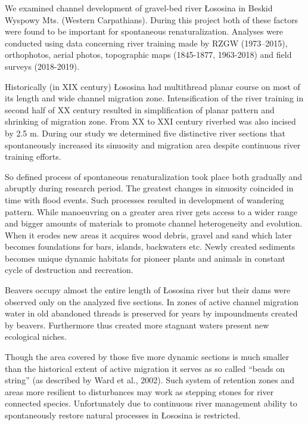 {We examined channel development of gravel-bed river Łososina in Beskid Wyspowy Mts. (Western Carpathians). During this project both of these factors were found to be important for spontaneous renaturalization. Analyses were conducted using data concerning river training made by RZGW (1973–2015), orthophotos, aerial photos, topographic maps (1845-1877, 1963-2018) and field surveys (2018-2019). 

Historically (in XIX century) Łososina had multithread planar course on most of its length and wide channel migration zone. Intensification of the river training in second half of XX century resulted in simplification of planar pattern and shrinking of migration zone. From XX to XXI century riverbed was also incised by 2.5 m. During our study we determined five distinctive river sections that spontaneously increased its sinuosity and migration area despite continuous river training efforts.

So defined process of spontaneous renaturalization took place both gradually and abruptly during research period. The greatest changes in sinuosity coincided in time with flood events. Such processes resulted in development of wandering pattern. While manoeuvring on a greater area river gets access to a wider range and bigger amounts of materials to promote channel heterogeneity and evolution. When it erodes new areas it acquires wood debris, gravel and sand which later becomes foundations for bars, islands, backwaters etc. Newly created sediments becomes unique dynamic habitats for pioneer plants and animals in constant cycle of destruction and recreation.

Beavers occupy almost the entire length of Łososina river but their dams were observed only on the analyzed five sections. In zones of active channel migration water in old abandoned threads is preserved for years by impoundments created by beavers. Furthermore thus created more stagnant waters present new ecological niches.

Though the area covered by those five more dynamic sections is much smaller than the historical extent of active migration it serves as so called “beads on string” (as described by Ward et al., 2002). Such system of retention zones and areas more resilient to disturbances may work as stepping stones for river connected species. Unfortunately due to continuous river management ability to spontaneously restore natural processes in Łososina is restricted.
}%
